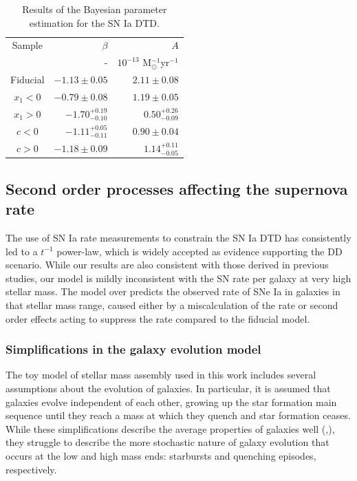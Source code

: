 \documentclass[fleqn,usenatbib]{mnras}
\begin{document}
\renewcommand{\arraystretch}{1.2}
\begin{table}
	\centering
	\caption{Results of the Bayesian parameter estimation for the SN Ia DTD.}
	\label{tab:dtd_results_split_lc}
	\begin{tabular}{crr} %
		\hline
		 Sample &$\beta$ & $A$ \\
		 &-       & $10^{-13}$ M$_{\odot}^{-1}$yr$^{-1}$ \\
		\hline
		Fiducial & $-1.13\pm0.05$ &  $2.11\pm0.08$ \\
	    $x_1 < 0$ & $-0.79\pm0.08$ &  $1.19 \pm0.05$ \\
		$x_1 > 0$ & $-1.70^{+0.19}_{-0.10}$ & $0.50^{+0.26}_{-0.09}$ \\
		$c < 0$ & $-1.11^{+0.05}_{-0.11}$ & $0.90\pm0.04$ \\
		$c > 0$ & $-1.18\pm0.09$ & $1.14^{+0.11}_{-0.05}$ \\
		\hline
	\end{tabular}
\end{table}
\subsection{Second order processes affecting the supernova rate \label{subsec:discussion}}

The use of SN Ia rate measurements to constrain the SN Ia DTD has consistently led to a $t^{-1}$ power-law, which is widely accepted as evidence supporting the DD scenario. While our results are also consistent with those derived in previous studies, our model is mildly inconsistent with the SN rate per galaxy at very high stellar mass. The model over predicts the observed rate of SNe Ia in galaxies in that stellar mass range, caused either by a miscalculation of the rate or second order effects acting to suppress the rate compared to the fiducial model.

\subsubsection{Simplifications in the galaxy evolution model}

The toy model of stellar mass assembly used in this work includes several assumptions about the evolution of galaxies. In particular, it is assumed that galaxies evolve independent of each other, growing up the star formation main sequence until they reach a mass at which they quench and star formation ceases. While these simplifications describe the average properties of galaxies well (\citealt{Zahid2012},), they struggle to describe the more stochastic nature of galaxy evolution that occurs at the low and high mass ends: starbursts and quenching episodes, respectively. 
\end{document}
